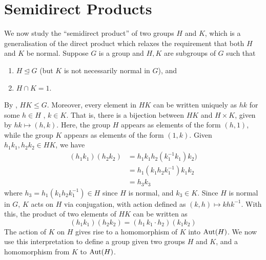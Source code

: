 \section{Semidirect Products}

We now study the ``semidirect product'' of two groups $H$ and $K$, which is a generalisation of the direct product which relaxes the requirement that both $H$ and $K$ be normal. Suppose $G$ is a group and $H,K$ are subgroups of $G$ such that 
\begin{enumerate}
    \item $H \trianglelefteq G$ (but $K$ is not necessarily normal in $G$), and
    \item $H \cap K = 1$. 
\end{enumerate}

By , $HK \leq G$. Moreover, every element in $HK$ can be written uniquely as $hk$ for some $h \in H$ , $k \in K$. That is, there is a bijection between $HK$ and $H \times K$, given by $hk \mapsto (h,k)$. Here, the group $H$ appears as elements of the form $(h,1)$, while the group $K$ appears as elements of the form $(1,k)$. Given $h_1k_1, h_2k_2 \in HK$, we have
\begin{align*}
    (h_1k_1)(h_2k_2) &= h_1k_1h_2(k_1^{-1}k_1)k_2) \\
    &= h_1(k_1h_2k_1^{-1})k_1k_2 \\
    &= h_3k_3
\end{align*}
where $h_3 = h_1(k_1h_2k_1^{-1}) \in H$ since $H$ is normal, and $k_3 \in K$. Since $H$ is normal in $G$, $K$ acts on $H$ via conjugation, with action defined as $(k,h) \mapsto khk^{-1}$. With this, the product of two elements of $HK$ can be written as
\[
    (h_1k_1)(h_2k_2) = (h_1 \, k_1 \cdot h_2)(k_1k_2)
\]
The action of $K$ on $H$ gives rise to a homomorphism of $K$ into $\operatorname{Aut}(H)$. We now use this interpretation to define a group given two groups $H$ and $K$, and a homomorphism from $K$ to $\operatorname{Aut}(H)$.

